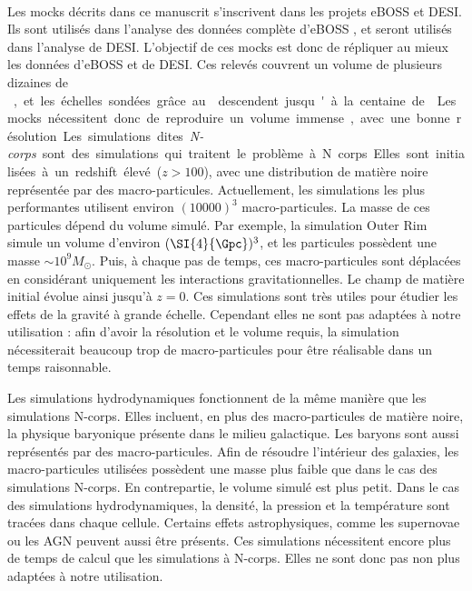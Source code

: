 \paragraph{}
Les mocks décrits dans ce manuscrit s'inscrivent dans les projets eBOSS et DESI. Ils sont utilisés dans l'analyse \lya{} des données complète d'eBOSS \autocite{DuMasdesBourboux2020}, et seront utilisés dans l'analyse \lya{} de DESI.
L'objectif de ces mocks est donc de répliquer au mieux les données \lya{} d'eBOSS et de DESI. Ces relevés couvrent un volume de plusieurs dizaines de \si{\cubic\Gpc}, et les échelles sondées grâce au \lya{} descendent jusqu'à la centaine de \si{\kpc}. Les mocks nécessitent donc de reproduire un volume immense, avec une bonne résolution.
Les simulations dites \emph{N-corps} sont des simulations qui traitent le problème à N corps.
Elles sont initialisées à un redshift élevé ($z > \num{100}$), avec une distribution de matière noire représentée par des macro-particules.
Actuellement, les simulations les plus performantes utilisent environ $(\num{10000})^3$ macro-particules.
La masse de ces particules dépend du volume simulé. Par exemple, la simulation Outer Rim \autocite{Heitmann2019} simule un volume d'environ $(\SI{4}{\Gpc})^3$, et les particules possèdent une masse $\sim 10^{9} M_{\odot}$.
Puis, à chaque pas de temps, ces macro-particules sont déplacées en considérant uniquement les interactions gravitationnelles. Le champ de matière initial évolue ainsi jusqu'à $z=0$. Ces simulations sont très utiles pour étudier les effets de la gravité à grande échelle. Cependant elles ne sont pas adaptées à notre utilisation : afin d'avoir la résolution et le volume requis, la simulation nécessiterait beaucoup trop de macro-particules pour être réalisable dans un temps raisonnable.

Les simulations hydrodynamiques fonctionnent de la même manière que les simulations N-corps. Elles incluent, en plus des macro-particules de matière noire, la physique baryonique présente dans le milieu galactique. Les baryons sont aussi représentés par des macro-particules. Afin de résoudre l'intérieur des galaxies, les macro-particules utilisées possèdent une masse plus faible que dans le cas des simulations N-corps. En contrepartie, le volume simulé est plus petit. Dans le cas des simulations hydrodynamiques, la densité, la pression et la température sont tracées dans chaque cellule. Certains effets astrophysiques, comme les supernovae ou les AGN peuvent aussi être présents. 
Ces simulations nécessitent encore plus de temps de calcul que les simulations à N-corps. Elles ne sont donc pas non plus adaptées à notre utilisation.

